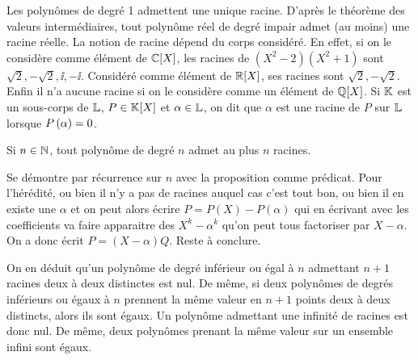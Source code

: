 \documentclass{magnolia}
\begin{document}
\begin{remarques}
\remarque Les polynômes de degré 1 admettent une unique racine.
\remarque D'après le théorème des valeurs intermédiaires, tout polynôme
  réel de degré impair admet (au moins) une racine réelle.
\remarque La notion de racine dépend du corps considéré. En effet, si on le
  considère comme élément de $\polyC$, les racines de \mbox{$(X^2-2)(X^2+1)$} sont
  $\sqrt{2},-\sqrt{2},\ii,-\ii$. Considéré comme élément de $\polyR$,
  ses racines sont $\sqrt{2},-\sqrt{2}$. Enfin il n'a aucune racine si
  on le considère comme un élément de $\polyQ$.
\remarque Si $\mathbb{K}$ est un sous-corps de $\mathbb{L}$, $P\in\polyK$
  et $\alpha\in\mathbb{L}$, on dit que $\alpha$ est une racine de $P$ sur $\mathbb{L}$
  lorsque $P\left(\alpha\right)=0$.
\end{remarques}

\begin{proposition}
Si $n\in\mathbb{N}$, tout polynôme de degré $n$ admet au plus $n$ racines.
\end{proposition}

\begin{preuve}
Se démontre par récurrence sur $n$ avec la proposition comme prédicat. Pour l'hérédité, ou bien il n'y a pas de racines auquel cas c'est tout bon, ou bien il en existe une $\alpha$ et on peut alors écrire $P=P(X)-P(\alpha)$ qui en écrivant avec les coefficients va faire apparaitre des $X^k-\alpha^k$ qu'on peut tous factoriser par $X-\alpha$. On a donc écrit $P=(X-\alpha)Q$. Reste à conclure.
\end{preuve}

\begin{remarques}
\remarque On en déduit qu'un polynôme de degré inférieur ou égal à $n$
  admettant $n+1$ racines deux à deux distinctes est nul. De même, si deux
  polynômes de degrés inférieurs ou égaux à $n$ prennent la même valeur
  en $n+1$ points deux à deux distincts, alors ils sont égaux.
\remarque Un polynôme admettant une infinité de racines est donc nul. De même,
  deux polynômes prenant la même valeur sur un ensemble infini sont
  égaux.
\end{remarques}
\end{document}
